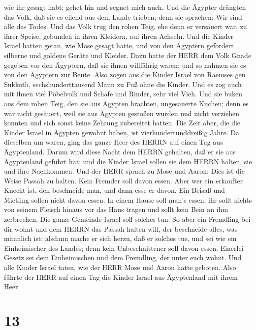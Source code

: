 wie ihr gesagt habt; gehet hin und segnet mich auch.  Und
die Ägypter drängten das Volk, daß sie es eilend aus dem Lande trieben;
denn sie sprachen: Wir sind alle des Todes.  Und das Volk
trug den rohen Teig, ehe denn er versäuert war, zu ihrer Speise,
gebunden in ihren Kleidern, auf ihren Achseln.  Und die
Kinder Israel hatten getan, wie Mose gesagt hatte, und von den Ägyptern
gefordert silberne und goldene Geräte und Kleider.  Dazu
hatte der HERR dem Volk Gnade gegeben vor den Ägyptern, daß sie ihnen
willfährig waren; und so nahmen sie es von den Ägyptern zur Beute.
 Also zogen aus die Kinder Israel von Raemses gen Sukkoth,
sechshunderttausend Mann zu Fuß ohne die Kinder.  Und es
zog auch mit ihnen viel Pöbelvolk und Schafe und Rinder, sehr viel Vieh.
 Und sie buken aus dem rohen Teig, den sie aus Ägypten
brachten, ungesäuerte Kuchen; denn es war nicht gesäuert, weil sie aus
Ägypten gestoßen wurden und nicht verziehen konnten und sich sonst keine
Zehrung zubereitet hatten.  Die Zeit aber, die die Kinder
Israel in Ägypten gewohnt haben, ist vierhundertunddreißig Jahre.
 Da dieselben um waren, ging das ganze Heer des HERRN auf
einen Tag aus Ägyptenland.  Darum wird diese Nacht dem
HERRN gehalten, daß er sie aus Ägyptenland geführt hat; und die Kinder
Israel sollen sie dem HERRN halten, sie und ihre Nachkommen.
 Und der HERR sprach zu Mose und Aaron: Dies ist die Weise
Passah zu halten. Kein Fremder soll davon essen.  Aber wer
ein erkaufter Knecht ist, den beschneide man, und dann esse er davon.
 Ein Beisaß und Mietling sollen nicht davon essen.
 In einem Hause soll man's essen; ihr sollt nichts von
seinem Fleisch hinaus vor das Haus tragen und sollt kein Bein an ihm
zerbrechen.  Die ganze Gemeinde Israel soll solches tun.
 So aber ein Fremdling bei dir wohnt und dem HERRN das
Passah halten will, der beschneide alles, was männlich ist; alsdann
mache er sich herzu, daß er solches tue, und sei wie ein Einheimischer
des Landes; denn kein Unbeschnittener soll davon essen. 
Einerlei Gesetz sei dem Einheimischen und dem Fremdling, der unter euch
wohnt.  Und alle Kinder Israel taten, wie der HERR Mose und
Aaron hatte geboten.  Also führte der HERR auf einen Tag
die Kinder Israel aus Ägyptenland mit ihrem Heer.

\hypertarget{section-12}{%
\section{13}\label{section-12}}

